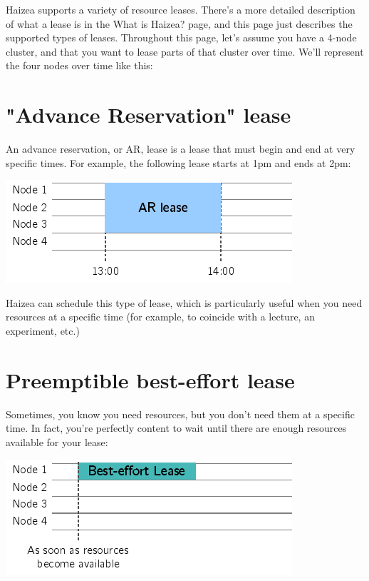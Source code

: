 Haizea supports a variety of resource leases. There's a more detailed description of what a lease is in the What is Haizea? page, and this page just describes the supported types of leases. Throughout this page, let's assume you have a 4-node cluster, and that you want to lease parts of that cluster over time. We'll represent the four nodes over time like this:

\section{"Advance Reservation" lease}

An advance reservation, or AR, lease is a lease that must begin and end at very specific times. For example, the following lease starts at 1pm and ends at 2pm:

\begin{center}
\includegraphics{images/lease_ar.png}
\end{center}

Haizea can schedule this type of lease, which is particularly useful when you need resources at a specific time (for example, to coincide with a lecture, an experiment, etc.)

\section{Preemptible best-effort lease}

Sometimes, you know you need resources, but you don't need them at a specific time. In fact, you're perfectly content to wait until there are enough resources available for your lease:

\begin{center}
\includegraphics{images/lease_be1.png}
\end{center}


